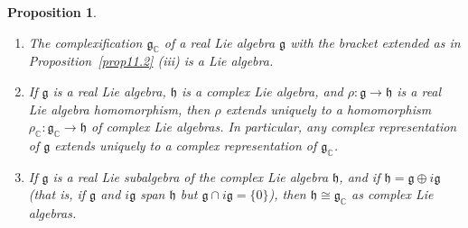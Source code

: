 \documentclass[12pt,reqno]{book}%
\newtheorem{proposition}{Proposition}[chapter]
\theoremstyle{definition}
\theoremstyle{remark}
\theoremstyle{theorem}
\theoremstyle{remark}
\begin{document}
\begin{proposition}\label{prop11.3}%
    \begin{enumerate}[label=(\roman*),font=\normalfont,before=\normalfont]
        \item The complexification $\mathfrak{g}_\mathbb{C}$ of a real Lie algebra $\mathfrak{g}$ with the bracket extended as in Proposition~\ref{prop11.2} (iii) is a Lie algebra.
        \item If $\mathfrak{g}$ is a real Lie algebra, $\mathfrak{h}$ is a complex Lie algebra, and $\rho : \mathfrak{g} \to \mathfrak{h}$ is a real Lie algebra homomorphism, then $\rho$ extends uniquely to a homomorphism $\rho_\mathbb{C} : \mathfrak{g}_\mathbb{C} \to \mathfrak{h}$ of complex Lie algebras.
            In particular, any complex representation of $\mathfrak{g}$ extends uniquely to a complex representation of $\mathfrak{g}_\mathbb{C}$.
        \item If $\mathfrak{g}$ is a real Lie subalgebra of the complex Lie algebra $\mathfrak{h}$, and if $\mathfrak{h} = \mathfrak{g} \oplus i \mathfrak{g}$ (that is, if $\mathfrak{g}$ and $i\mathfrak{g}$ span $\mathfrak{h}$ but $\mathfrak{g} \cap i \mathfrak{g} = \{0\}$), then $\mathfrak{h} \cong \mathfrak{g}_\mathbb{C}$ as complex Lie algebras.
    \end{enumerate}
\end{proposition}%
\end{document}
